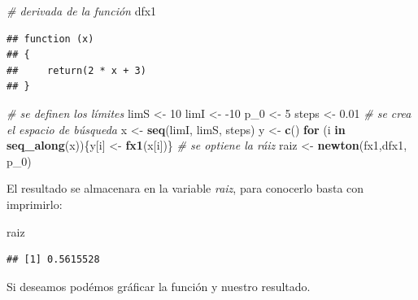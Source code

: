 \documentclass[11pt,]{article}
\newenvironment{Shaded}{\begin{snugshade}}{\end{snugshade}}
\newcommand{\CommentTok}[1]{\textcolor[rgb]{0.56,0.35,0.01}{\textit{#1}}}
\newcommand{\ControlFlowTok}[1]{\textcolor[rgb]{0.13,0.29,0.53}{\textbf{#1}}}
\newcommand{\DecValTok}[1]{\textcolor[rgb]{0.00,0.00,0.81}{#1}}
\newcommand{\FloatTok}[1]{\textcolor[rgb]{0.00,0.00,0.81}{#1}}
\newcommand{\KeywordTok}[1]{\textcolor[rgb]{0.13,0.29,0.53}{\textbf{#1}}}
\newcommand{\NormalTok}[1]{#1}
\newcommand{\StringTok}[1]{\textcolor[rgb]{0.31,0.60,0.02}{#1}}
\begin{document}
\begin{Shaded}
\begin{Highlighting}[]
\CommentTok{# derivada de la función}
\NormalTok{dfx1}
\end{Highlighting}
\end{Shaded}

\begin{verbatim}
## function (x) 
## {
##     return(2 * x + 3)
## }
\end{verbatim}

\begin{Shaded}
\begin{Highlighting}[]
\CommentTok{# se definen los límites}
\NormalTok{limS <-}\StringTok{ }\DecValTok{10}
\NormalTok{limI <-}\StringTok{ }\DecValTok{-10}
\NormalTok{p_}\DecValTok{0}\NormalTok{ <-}\StringTok{ }\DecValTok{5}
\NormalTok{steps <-}\StringTok{ }\FloatTok{0.01}
\CommentTok{# se crea el espacio de búsqueda}
\NormalTok{x <-}\StringTok{ }\KeywordTok{seq}\NormalTok{(limI, limS, steps)}
\NormalTok{y <-}\StringTok{ }\KeywordTok{c}\NormalTok{()}
\ControlFlowTok{for}\NormalTok{ (i }\ControlFlowTok{in} \KeywordTok{seq_along}\NormalTok{(x))\{y[i] <-}\StringTok{ }\KeywordTok{fx1}\NormalTok{(x[i])\}}
\CommentTok{# se optiene la ráiz}
\NormalTok{raiz <-}\StringTok{ }\KeywordTok{newton}\NormalTok{(fx1,dfx1, p_}\DecValTok{0}\NormalTok{)}
\end{Highlighting}
\end{Shaded}

El resultado se almacenara en la variable \emph{raiz}, para conocerlo
basta con imprimirlo:

\begin{Shaded}
\begin{Highlighting}[]
\NormalTok{raiz}
\end{Highlighting}
\end{Shaded}

\begin{verbatim}
## [1] 0.5615528
\end{verbatim}

Si deseamos podémos gráficar la función y nuestro resultado.
\end{document}
